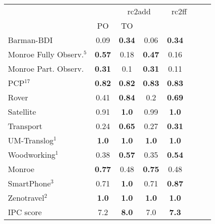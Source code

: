 \begin{tabular}{lccccccl} 
\toprule 
  && \multicolumn{2}{c}{rc2add} & \multicolumn{2}{c}{rc2ff} \\ 
\cmidrule(lr){3-4} \cmidrule(lr){5-6}  
 &PO & TO  \\ 
\midrule 
Barman-BDI & 0.09 & \textbf{0.34} & 0.06 & \textbf{0.34}  \\ 
Monroe Fully Observ.$^{5}$ & \textbf{0.57} & 0.18 & \textbf{0.47} & 0.16  \\ 
Monroe Part. Observ. & \textbf{0.31} & 0.1 & \textbf{0.31} & 0.11  \\ 
PCP$^{17}$ & \textbf{0.82} & \textbf{0.82} & \textbf{0.83} & \textbf{0.83}  \\ 
Rover & 0.41 & \textbf{0.84} & 0.2 & \textbf{0.69}  \\ 
Satellite & 0.91 & \textbf{1.0} & 0.99 & \textbf{1.0}  \\ 
Transport & 0.24 & \textbf{0.65} & 0.27 & \textbf{0.31}  \\ 
UM-Translog$^{1}$ & \textbf{1.0} & \textbf{1.0} & \textbf{1.0} & \textbf{1.0}  \\ 
Woodworking$^{1}$ & 0.38 & \textbf{0.57} & 0.35 & \textbf{0.54}  \\ 
\midrule 
 Monroe & \textbf{0.77} & 0.48 & \textbf{0.75} & 0.48  \\ 
SmartPhone$^{3}$ & 0.71 & \textbf{1.0} & 0.71 & \textbf{0.87}  \\ 
Zenotravel$^{2}$ & \textbf{1.0} & \textbf{1.0} & \textbf{1.0} & \textbf{1.0}  \\ 
\midrule 
 IPC score & 7.2 & \textbf{8.0} & 7.0 & \textbf{7.3}  \\ 
\bottomrule 
 \end{tabular} 
